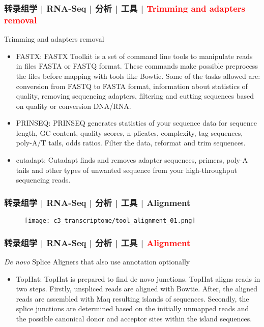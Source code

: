 \begin{frame}
  \frametitle{转录组学 | RNA-Seq | 分析 | 工具 | \textcolor{red}{Trimming and adapters removal}}
    {\footnotesize
  \begin{block}{Trimming and adapters removal}
    \begin{itemize}
      \item FASTX: FASTX Toolkit is a set of command line tools to manipulate reads in files FASTA or FASTQ format. These commands make possible preprocess the files before mapping with tools like Bowtie. Some of the tasks allowed are: conversion from FASTQ to FASTA format, information about statistics of quality, removing sequencing adapters, filtering and cutting sequences based on quality or conversion DNA/RNA.
      \item PRINSEQ: PRINSEQ generates statistics of your sequence data for sequence length, GC content, quality scores, n-plicates, complexity, tag sequences, poly-A/T tails, odds ratios. Filter the data, reformat and trim sequences.
      \item cutadapt: Cutadapt finds and removes adapter sequences, primers, poly-A tails and other types of unwanted sequence from your high-throughput sequencing reads.
    \end{itemize}
  \end{block}
  }
\end{frame}

\begin{frame}
  \frametitle{转录组学 | RNA-Seq | 分析 | 工具 | Alignment}
  \begin{figure}
    \centering
    \texttt{[image: c3\_transcriptome/tool\_alignment\_01.png]}
  \end{figure}
\end{frame}

\begin{frame}
  \frametitle{转录组学 | RNA-Seq | 分析 | 工具 | \textcolor{red}{Alignment}}
  \begin{block}{\textit{De novo} Splice Aligners that also use annotation optionally}
    \begin{itemize}
      \item TopHat: TopHat is prepared to find de novo junctions. TopHat aligns reads in two steps. Firstly, unspliced reads are aligned with Bowtie. After, the aligned reads are assembled with Maq resulting islands of sequences. Secondly, the splice junctions are determined based on the initially unmapped reads and the possible canonical donor and acceptor sites within the island sequences.
    \end{itemize}
  \end{block}
\end{frame}

